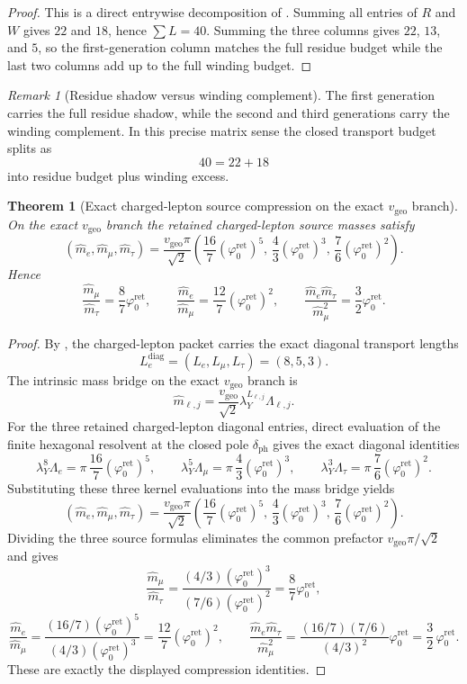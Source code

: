 \documentclass[11pt,a4paper]{article}
\newtheorem{theorem}{Theorem}[section]
\theoremstyle{definition}
\theoremstyle{remark}
\newtheorem*{remark}{Remark}
\newcommand{\phiz}{\varphi_0^{\mathrm{ret}}}
\newcommand{\lambdaY}{\lambda_Y}
\newcommand{\vgeo}{v_{\mathrm{geo}}}
\begin{document}
\begin{proof}
This is a direct entrywise decomposition of . Summing all entries of
$R$ and $W$ gives $22$ and $18$, hence $\sum L=40$. Summing the three columns gives
$22$, $13$, and $5$, so the first-generation column matches the full residue budget while the last
two columns add up to the full winding budget.
\end{proof}

\begin{remark}[Residue shadow versus winding complement]
The first generation carries the full residue shadow, while the second and third generations carry
the winding complement. In this precise matrix sense the closed transport budget splits as
\[
40=22+18
\]
into residue budget plus winding excess.
\end{remark}

\begin{theorem}[Exact charged-lepton source compression on the exact \texorpdfstring{$\vgeo$}{vgeo} branch]
\label{thm:charged-lepton-compression}
On the exact $\vgeo$ branch the retained charged-lepton source masses satisfy
\[
(\hat m_e,\hat m_\mu,\hat m_\tau)
=
\frac{\vgeo\pi}{\sqrt2}
\left(
\frac{16}{7}(\phiz)^5,\,
\frac{4}{3}(\phiz)^3,\,
\frac{7}{6}(\phiz)^2
\right).
\]
Hence
\[
\frac{\hat m_\mu}{\hat m_\tau}=\frac{8}{7}\phiz,
\qquad
\frac{\hat m_e}{\hat m_\mu}=\frac{12}{7}(\phiz)^2,
\qquad
\frac{\hat m_e \hat m_\tau}{\hat m_\mu^2}=\frac{3}{2}\phiz.
\]
\end{theorem}

\begin{proof}
By , the charged-lepton packet carries the exact diagonal
transport lengths
\[
L_e^{\mathrm{diag}}=(L_e,L_\mu,L_\tau)=(8,5,3).
\]
The intrinsic mass bridge on the exact $\vgeo$ branch is
\[
\hat m_{\ell,j}
=
\frac{\vgeo}{\sqrt2}\lambdaY^{L_{\ell,j}}\Lambda_{\ell,j}.
\]
For the three retained charged-lepton diagonal entries, direct evaluation of the finite hexagonal
resolvent  at the closed pole $\delta_{\mathrm{ph}}$ gives the
exact diagonal identities
\[
\lambdaY^{8}\Lambda_e
=
\pi\,\frac{16}{7}(\phiz)^5,
\qquad
\lambdaY^{5}\Lambda_\mu
=
\pi\,\frac{4}{3}(\phiz)^3,
\qquad
\lambdaY^{3}\Lambda_\tau
=
\pi\,\frac{7}{6}(\phiz)^2.
\]
Substituting these three kernel evaluations into the mass bridge yields
\[
(\hat m_e,\hat m_\mu,\hat m_\tau)
=
\frac{\vgeo\pi}{\sqrt2}
\left(
\frac{16}{7}(\phiz)^5,\,
\frac{4}{3}(\phiz)^3,\,
\frac{7}{6}(\phiz)^2
\right).
\]
Dividing the three source formulas eliminates the common prefactor $\vgeo\pi/\sqrt2$ and gives
\[
\frac{\hat m_\mu}{\hat m_\tau}
=
\frac{(4/3)(\phiz)^3}{(7/6)(\phiz)^2}
=
\frac{8}{7}\phiz,
\]
\[
\frac{\hat m_e}{\hat m_\mu}
=
\frac{(16/7)(\phiz)^5}{(4/3)(\phiz)^3}
=
\frac{12}{7}(\phiz)^2,
\qquad
\frac{\hat m_e \hat m_\tau}{\hat m_\mu^2}
=
\frac{(16/7)(7/6)}{(4/3)^2}\phiz
=
\frac32\,\phiz.
\]
These are exactly the displayed compression identities.
\end{proof}
\end{document}
